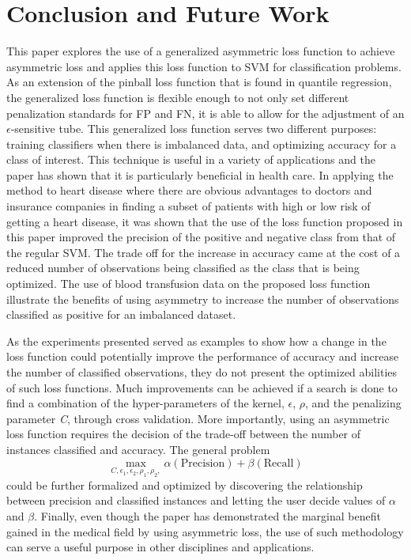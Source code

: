 \documentclass[twoside,11pt]{article}
\begin{document}
\section{Conclusion and Future Work}
 This paper explores the use of a generalized asymmetric loss function to achieve asymmetric loss and applies this loss function to SVM for classification problems. As an extension of the pinball loss function that is found in quantile regression, the generalized loss function is flexible enough to not only set different penalization standards for FP and FN, it is able to allow for the adjustment of an  $\epsilon$-sensitive tube. This generalized loss function serves two different purposes: training classifiers when there is imbalanced data, and optimizing accuracy for a class of interest. This technique is useful in a variety of applications and the paper has shown that it is particularly beneficial in health care. In applying the method to heart disease where there are obvious advantages to doctors and insurance companies in finding a subset of patients with high or low risk of getting a heart disease, it was shown that the use of the loss function proposed in this paper improved the precision of the positive and negative class from that of the regular SVM. The trade off for the increase in accuracy came at the cost of a reduced number of observations being classified as the class that is being optimized. The use of blood transfusion data on the proposed loss function illustrate the benefits of using asymmetry to increase the number of observations classified as positive for an imbalanced dataset. 

 As the experiments presented served as examples to show how a change in the loss function could potentially improve the performance of accuracy and increase the number of classified observations, they do not present the optimized abilities of such loss functions. Much improvements can be achieved if a search is done to find a combination of the hyper-parameters of the kernel, $\epsilon$, $\rho$, and the penalizing parameter \emph{C}, through cross validation. More importantly, using an asymmetric loss function requires the decision of the trade-off between the number of instances classified and accuracy. The general problem
 \begin{equation}
 \max_{C,\epsilon_1,\epsilon_2,\rho_1,\rho_2,} \alpha(\text{Precision}) + \beta(\text{Recall})
 \end{equation}
could be further formalized and optimized by discovering the relationship between precision and classified instances and letting the user decide values of $\alpha$ and $\beta$. Finally, even though the paper has demonstrated the marginal benefit gained in the medical field by using asymmetric loss, the use of such methodology can serve a useful purpose in other disciplines and applications.


\end{document}
